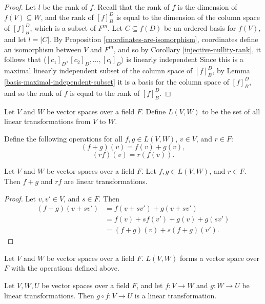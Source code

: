 \begin{proof}
    Let $l$ be the rank of $f$. Recall that the rank of $f$ is the dimension of $f(V) \subseteq W$, and the rank of $[f]_B^D$ is equal to the dimension of the column space of $[f]_B^D$, which is a subset of $F^m$. Let $C \subseteq f(D)$ be an ordered basis for $f(V)$, and let $l = |C|$. By Proposition \ref{coordinates-are-isomorphism}, coordinates define an isomorphism between $V$ and $F^m$, and so by Corollary \ref{injective-nullity-rank}, it follows that $\langle [c_1]_D, [c_2]_D, \ldots, [c_l]_D\rangle$ is linearly independent Since this is a maximal linearly independent subset of the column space of $[f]_B^D$, by Lemma \ref{basis-maximal-independent-subset} it is a basis for the column space of $[f]_B^D$, and so the rank of $f$ is equal to the rank of $[f]_B^D$.
\end{proof}

\begin{defn}
    Let $V$ and $W$ be vector spaces over a field $F$. Define $L(V, W)$ to be the set of all linear transformations from $V$ to $W$.
\end{defn}

\begin{defn}
    Define the following operations for all $f, g \in L(V, W)$, $v \in V$, and $r \in F$:
    \[(f + g)(v) = f(v) + g(v),\]
    \[(rf)(v) = r(f(v)).\]
\end{defn}

\begin{lemma}
    Let $V$ and $W$ be vector spaces over a field $F$. Let $f, g \in L(V, W)$, and $r \in F$. Then $f + g$ and $rf$ are linear transformations.
\end{lemma}

\begin{proof}
    Let $v, v' \in V$, and $s \in F$. Then
    \begin{align*}
        (f + g)(v + sv') &= f(v + sv') + g(v + sv') \\
        &= f(v) + sf(v') + g(v) + g(sv') \\
        &= (f + g)(v) + s(f + g)(v').
    \end{align*}
\end{proof}

\begin{thm}
    Let $V$ and $W$ be vector spaces over a field $F$. $L(V, W)$ forms a vector space over $F$ with the operations defined above.
\end{thm}

\begin{thm}
    Let $V, W, U$ be vector spaces over a field $F$, and let $f: V \to W$ and $g: W \to U$ be linear transformations. Then $g \circ f: V \to U$ is a linear transformation.
\end{thm}

